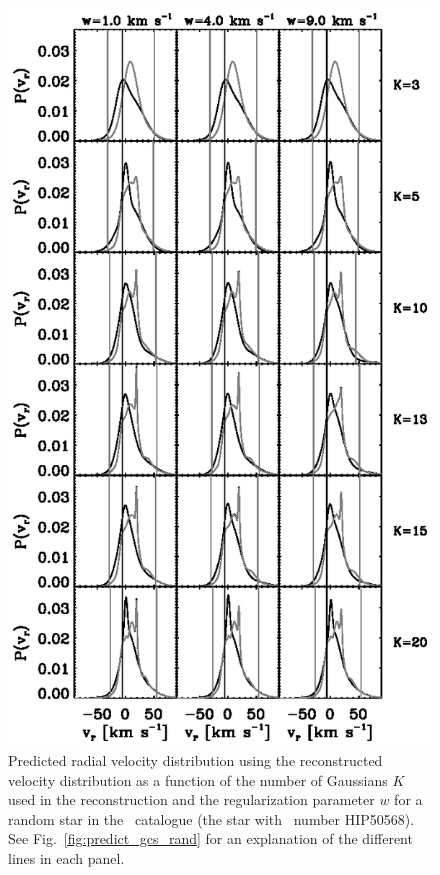 \clearpage
\begin{figure}
\includegraphics{tile_onepred.ps}
\caption{Predicted radial velocity distribution using the reconstructed velocity distribution as a function of the number of Gaussians $K$ used in the reconstruction and the regularization parameter $w$ for a random star in the \gcsabb\ catalogue (the star with \Hipparcos\ number HIP50568). See Fig.~\ref{fig:predict_gcs_rand} for an explanation of the different lines in each panel.}%
\label{fig:tile_onepred}
\end{figure}



